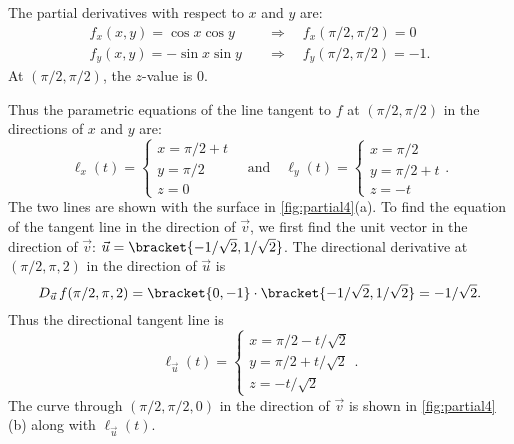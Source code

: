 
{The partial derivatives with respect to $x$ and $y$ are:
\begin{align*}
f_x(x,y) = \cos x\cos y\quad &\Rightarrow \quad f_x(\pi/2,\pi/2) = 0\\
f_y(x,y) = -\sin x\sin y\quad&\Rightarrow \quad f_y(\pi/2,\pi/2)=-1.
\end{align*}
At $(\pi/2,\pi/2)$, the $z$-value is 0.

Thus the parametric equations of the line tangent to $f$ at $(\pi/2,\pi/2)$ in the directions of $x$  and $y$ are:
%
%
\[
\ell_x(t) = \begin{cases}x=\pi/2 + t\\ y=\pi/2 \\z=0 \end{cases}
\quad \text{and}\quad 
\ell_y(t) = \begin{cases}x=\pi/2 \\ y=\pi/2+t \\z=-t \end{cases}.
\]
The two lines are shown with the surface in \autoref{fig:partial4}(a). To find the equation of the tangent line in the direction of $\vec v$, we first find the unit vector in the direction of $\vec v$: $\vec u =\bracket{-1/\sqrt{2},1/\sqrt{2}}$. The directional derivative at $(\pi/2,\pi,2)$ in the direction of $\vec u$ is 
\[D_{\vec u\,}f(\pi/2,\pi,2) =\bracket{0,-1}\cdot\bracket{-1/\sqrt{2},1/\sqrt 2}= -1/\sqrt 2.\]
Thus the directional tangent line is 
\[\ell_{\vec u}(t) = \begin{cases}x= \pi/2 -t/\sqrt{2}\\ y = \pi/2 + t/\sqrt{2} \\ z= -t/\sqrt{2}\end{cases}.\]
The curve through $(\pi/2,\pi/2,0)$ in the direction of $\vec v$ is shown in \autoref{fig:partial4}(b) along with $\ell_{\vec u}(t)$.}

